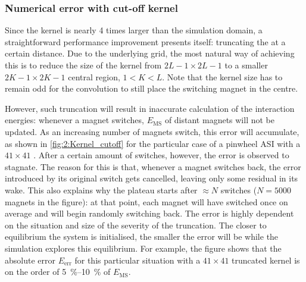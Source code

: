 \subsubsection{Numerical error with cut-off kernel}\label{sec:2:Kernels:Error}
Since the kernel is nearly 4 times larger than the simulation domain, a straightforward performance improvement presents itself: truncating the  at a certain distance.
Due to the underlying grid, the most natural way of achieving this is to reduce the size of the kernel from $2L-1 \times 2L-1$ to a smaller $2K-1 \times 2K-1$ central region, $1 < K < L$.
Note that the kernel size has to remain odd for the convolution to still place the switching magnet in the centre. \par
However, such truncation will result in inaccurate calculation of the interaction energies: whenever a magnet switches, $E_\mathrm{MS}$ of distant magnets will not be updated.
As an increasing number of magnets switch, this error will accumulate, as shown in \cref{fig:2:Kernel_cutoff} for the particular case of a pinwheel ASI with a $41 \times 41$ .
After a certain amount of switches, however, the error is observed to stagnate.
The reason for this is that, whenever a magnet switches back, the error introduced by its original switch gets cancelled, leaving only some residual  in its wake.
This also explains why the plateau starts after $\approx N$ switches ($N=5000$ magnets in the figure): at that point, each magnet will have switched once on average and will begin randomly switching back.
The error is highly dependent on the situation and size of the severity of the truncation.
The closer to equilibrium the system is initialised, the smaller the error will be while the simulation explores this equilibrium.
For example, the figure shows that the absolute error $E_\mathrm{err}$ for this particular situation with a $41 \times 41$ truncated kernel is on the order of \SIrange{5}{10}{\percent} of $E_\mathrm{MS}$.


